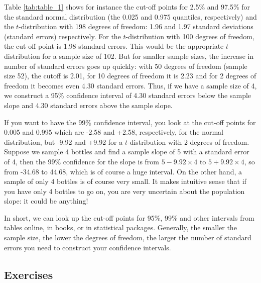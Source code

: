 \documentclass[]{report}\usepackage[]{graphicx}\usepackage[]{color}
\begin{document}
Table \ref{tab:table_1} shows for instance the cut-off points for 2.5\% and 97.5\% for the standard normal distribution (the 0.025 and 0.975 quantiles, respectively) and the $t$-distribution with 198 degrees of freedom: 1.96 and 1.97 standard deviations (standard errors) respectively. For the $t$-distribution with 100 degrees of freedom, the cut-off point is 1.98 standard errors. This would be the appropriate $t$-distribution for a sample size of 102. But for smaller sample sizes, the increase in number of standard errors goes up quickly: with 50 degrees of freedom (sample size 52), the cutoff is 2.01, for 10 degrees of freedom it is 2.23 and for 2 degrees of freedom it becomes even 4.30 standard errors. Thus, if we have a sample size of 4, we construct a 95\% confidence interval of 4.30 standard errors below the sample slope and 4.30 standard errors above the sample slope.

If you want to have the 99\% confidence interval, you look at the cut-off points for 0.005 and 0.995 which are -2.58 and +2.58, respectively, for the normal distribution, but -9.92 and +9.92 for a $t$-distribution with 2 degrees of freedom. Suppose we sample 4 bottles and find a sample slope of 5 with a standard error of 4, then the 99\% confidence for the slope is from $5-9.92\times 4$ to $5+9.92\times 4$, so from -34.68 to 44.68, which is of course a huge interval. On the other hand, a sample of only 4 bottles is of course very small. It makes intuitive sense that if you have only 4 bottles to go on, you are very uncertain about the population slope: it could be anything!

In short, we can look up the cut-off points for 95\%, 99\% and other intervals from tables online, in books, or in statistical packages. Generally, the smaller the sample size, the lower the degrees of freedom, the larger the number of standard errors you need to construct your confidence intervals.






\subsection{Exercises}
\end{document}
